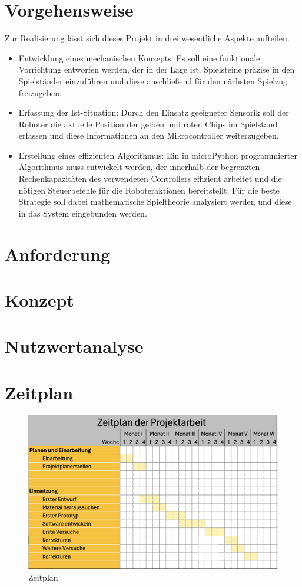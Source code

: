 \section{Vorgehensweise}
Zur Realisierung lässt sich dieses Projekt in drei wesentliche Aspekte aufteilen.
\begin{itemize}
	\item Entwicklung eines mechanischen Konzepts: Es soll eine funktionale Vorrichtung entworfen werden, der in der Lage ist, Spielsteine präzise in den Spielständer einzuführen und diese anschließend für den nächsten Spielzug freizugeben.
	\item Erfassung der Ist-Situation: Durch den Einsatz geeigneter Sensorik soll der Roboter die aktuelle Position der gelben und roten Chips im Spielstand erfassen und diese Informationen an den Mikrocontroller weiterzugeben.
	\item Erstellung eines effizienten Algorithmus: Ein in microPython programmierter Algorithmus muss entwickelt werden, der innerhalb der begrenzten Rechenkapazitäten des verwendeten Controllers effizient arbeitet und die nötigen Steuerbefehle für die Roboteraktionen bereitstellt. Für die beste Strategie soll dabei mathematische Spieltheorie analysiert werden und diese in das System eingebunden werden.
\end{itemize}

\section{Anforderung}
\section{Konzept}
\section{Nutzwertanalyse}
\section{Zeitplan}
\begin{figure}[hbt]
\centering
\includegraphics[width=0.9\linewidth]{images/Zeitplan}
\caption[Zeitplan]{ Zeitplan}
\label{fig:Zeitplan}
\end{figure}